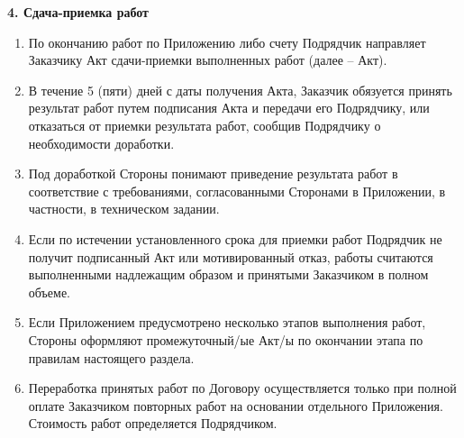 \documentclass[a4paper, fontsize=12bp]{article}
\newcounter{enum}
\begin{document}
\begin{center}
\newpage
\textbf{4. Сдача-приемка работ}
\end{center}
\begin{enumerate}[label=\arabic{enum}.\arabic*.]
\item По окончанию работ по Приложению либо счету Подрядчик направляет Заказчику Акт сдачи-приемки выполненных работ (далее – Акт).

\item В течение 5 (пяти) дней с даты получения Акта, Заказчик обязуется принять результат работ путем подписания Акта и передачи его Подрядчику, или отказаться от приемки результата работ, сообщив Подрядчику о необходимости доработки.

\item Под доработкой Стороны понимают приведение результата работ в соответствие с требованиями, согласованными Сторонами в Приложении, в частности, в техническом задании.

\item Если по истечении установленного срока для приемки работ Подрядчик не получит подписанный Акт или мотивированный отказ, работы считаются выполненными надлежащим образом и принятыми Заказчиком в полном объеме.

\item Если Приложением предусмотрено несколько этапов выполнения работ,
Стороны оформляют промежуточный/ые Акт/ы по окончании этапа по правилам настоящего раздела.

\item Переработка принятых работ по Договору осуществляется только при полной оплате Заказчиком повторных работ на основании отдельного Приложения. Стоимость работ определяется Подрядчиком.
\end{enumerate}
\end{document}
